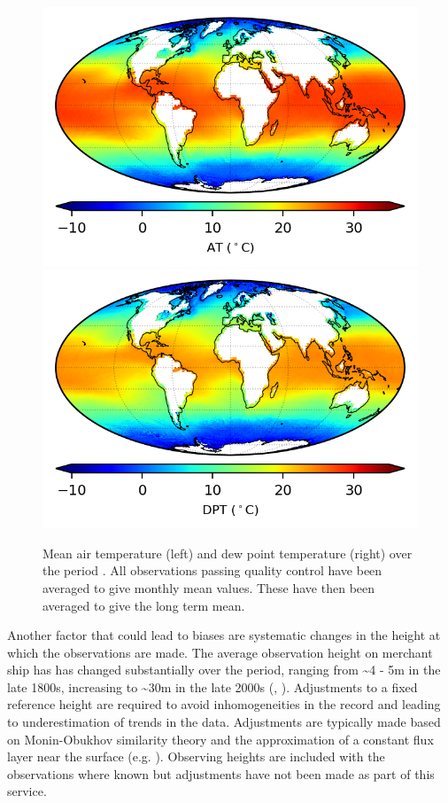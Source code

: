 \begin{figure}[h]
    \centering
    \includegraphics{resources/observations-at-mean-map-optimal.png}
    \includegraphics{resources/observations-dpt-mean-map-optimal.png}
    \caption{Mean air temperature (left) and dew point temperature (right) over the period \datatimerange{}. All observations passing quality control have been averaged to give monthly mean values. These have then been averaged to give the long term mean.\\}
    \label{fig:at-map}
\end{figure}
\FloatBarrier
Another factor that could lead to biases are systematic changes in the height at which the observations are made. The average observation height on merchant ship has has changed substantially over the period, ranging from \sim 4 - 5m in the late 1800s, increasing to \sim 30m in the late 2000s (\cite{Kent2007}, \cite{ Kent2013NMAT}). 
Adjustments to a fixed reference height are required to avoid inhomogeneities in the record and leading to underestimation of trends in the data. 
Adjustments are typically made based on Monin-Obukhov similarity theory and the approximation of a constant flux layer near the surface (e.g. \cite{Businger1971}). 
Observing heights are included with the observations where known but adjustments have not been made as part of this service.

